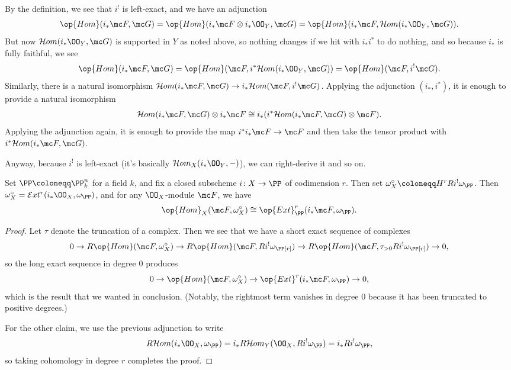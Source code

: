 \documentclass[../notes.tex]{subfiles}
\begin{document}
By the definition, we see that $i^!$ is left-exact, and we have an adjunction
\[\op{Hom}(i_*\mc F,\mc G)=\op{Hom}(i_*\mc F\otimes i_*\OO_Y,\mc G)=\op{Hom}(i_*\mc F,\mathcal Hom(i_*\OO_Y,\mc G)).\]
But now $\mathcal Hom(i_*\OO_Y,\mc G)$ is supported in $Y$ as noted above, so nothing changes if we hit with $i_*i^*$ to do nothing, and so because $i_*$ is fully faithful, we see
\[\op{Hom}(i_*\mc F,\mc G)=\op{Hom}(\mc F,i^*\mathcal Hom(i_*\OO_Y,\mc G))=\op{Hom}(\mc F,i^!\mc G).\]
Similarly, there is a natural isomorphism $\mathcal Hom(i_*\mc F,\mc G)\to i_*\mathcal Hom(\mc F,i^!\mc G)$. Applying the adjunction $(i_*,i^*)$, it is enough to provide a natural isomorphism
\[\mathcal Hom(i_*\mc F,\mc G)\otimes i_*\mc F\cong i_*(i^*\mathcal Hom(i_*\mc F,\mc G)\otimes\mc F).\]
Applying the adjunction again, it is enough to provide the map $i^*i_*\mc F\to\mc F$ and then take the tensor product with $i^*\mathcal Hom(i_*\mc F,\mc G)$.

Anyway, because $i^!$ is left-exact (it's basically $\mathcal Hom_X(i_*\OO_Y,-)$), we can right-derive it and so on.
\begin{lemma}
	Set $\PP\coloneqq\PP^n_k$ for a field $k$, and fix a closed subscheme $i\colon X\to\PP$ of codimension $r$. Then set $\omega^\circ_X\coloneqq H^rRi^!\omega_\PP$. Then $\omega^\circ_X=\mathcal Ext^r(i_*\OO_X,\omega_\PP)$, and for any $\OO_X$-module $\mc F$, we have
	\[\op{Hom}_X(\mc F,\omega_X^\circ)\cong\op{Ext}^r_\PP(i_*\mc F,\omega_\PP).\]
\end{lemma}
\begin{proof}
	Let $\tau$ denote the truncation of a complex. Then we see that we have a short exact sequence of complexes
	\[0\to R\op{Hom}(\mc F,\omega_X^\circ)\to R\op{Hom}(\mc F,Ri^!\omega_\PP[r])\to R\op{Hom}(\mc F,\tau_{>0}Ri^!\omega_\PP[r])\to0,\]
	so the long exact sequence in degree $0$ produces
	\[0\to\op{Hom}(\mc F,\omega_X^\circ)\to\op{Ext}^r(i_*\mc F,\omega_\PP)\to0,\]
	which is the result that we wanted in conclusion. (Notably, the rightmost term vanishes in degree $0$ because it has been truncated to positive degrees.)

	For the other claim, we use the previous adjunction to write
	\[R\mathcal Hom(i_*\OO_X,\omega_\PP)=i_*R\mathcal Hom_Y(\OO_X,Ri^!\omega_\PP)=i_*Ri^!\omega_\PP,\]
	so taking cohomology in degree $r$ completes the proof.
\end{proof}
\end{document}
